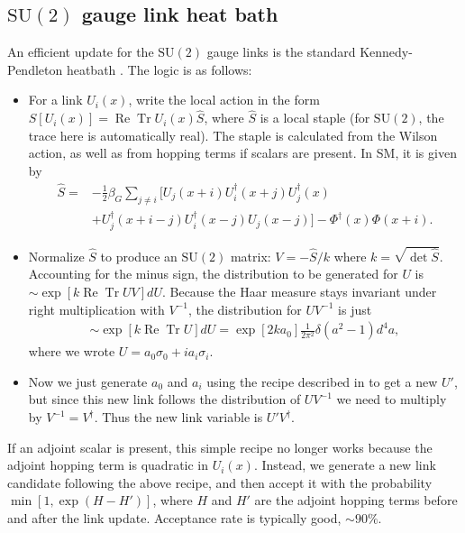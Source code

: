 \documentclass[11pt,a4paper]{article}
\newcommand\RE{\operatorname{Re}}
\newcommand\Tr{\operatorname{Tr}}
\newcommand\he[1]{#1^\dagger}%
\newcommand\gr[1]{\mathrm{#1}}%
\begin{document}
\subsection{$\gr{SU(2)}$ gauge link heat bath}

An efficient update for the $\gr{SU(2)}$ gauge links is the standard Kennedy-Pendleton heatbath \cite{Kennedy:1985nu}. The logic is as follows:
\begin{itemize}

	\item For a link $U_i(x)$, write the local action in the form $S[U_i(x)] = \RE \Tr U_i(x) \hat{S}$, where $\hat{S}$ is a local staple (for $\gr{SU(2)}$, the trace here is automatically real). The staple is calculated from the Wilson action, as well as from hopping terms if scalars are present. In SM, it is given by
\begin{align}
\hat{S} =& - \frac12 \beta_G \sum_{j \neq i} \Big[ U_j(x+i) U^\dagger_i(x+j) U^\dagger_j(x) \nonumber \\ 
 &+ U^\dagger_j(x+i-j) U^\dagger_i(x-j) U_j(x-j) \Big] - \he\Phi(x)\Phi(x+i). 
\end{align} 

	\item Normalize $\hat{S}$ to produce an $\gr{SU(2)}$ matrix: $V = -\hat{S} /k$ where $k = \sqrt{\det \hat{S}}$. Accounting for the minus sign, the distribution to be generated for $U$ is $\sim \exp[k \RE\Tr U V] dU$. Because the Haar measure stays invariant under right multiplication with $V^{-1}$, the distribution for $U V^{-1}$ is just 
\begin{align}
\sim \exp[k \RE\Tr U] dU = \exp[2 k a_0] \frac{1}{2\pi^2} \delta(a^2-1) d^4 a,
\end{align}
where we wrote $U = a_0 \sigma_0 + i a_i \sigma_i$.

	\item Now we just generate $a_0$ and $a_i$ using the recipe described in \cite{Kennedy:1985nu} to get a new $U'$, but since this new link follows the distribution of $U V^{-1}$ we need to multiply by $V^{-1} = \he V$. Thus the new link variable is $U' \he V$.

\end{itemize}


If an adjoint scalar is present, this simple recipe no longer works because the adjoint hopping term is quadratic in $U_i(x)$. Instead, we generate a new link candidate following the above recipe, and then accept it with the probability $\min[1, \exp(H - H')]$, where $H$ and $H'$ are the adjoint hopping terms before and after the link update. Acceptance rate is typically good, $\sim 90\%$.
\end{document}
